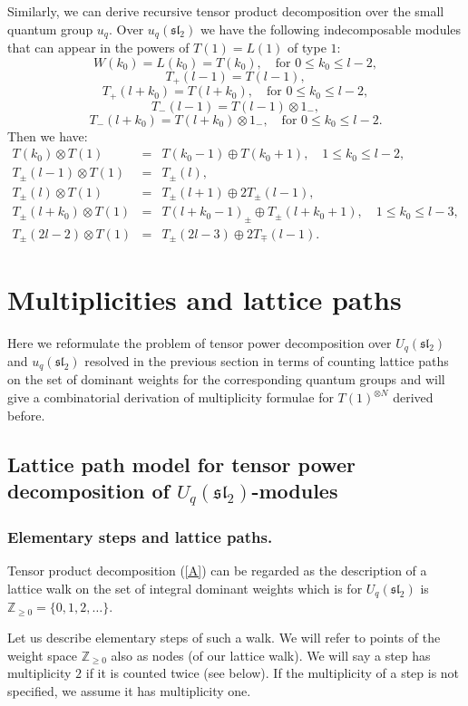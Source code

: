 \documentclass[11pt]{amsart}
\newcommand\lie[1]{\mathfrak{#1}}
\newcommand{\Z}{\mathbb{Z}}
\begin{document}
Similarly, we can derive recursive tensor product decomposition over the small quantum group $u_q$. 
Over $u_q(\lie{sl}_2)$ we have the following indecomposable modules that can appear in the powers of $T(1)=L(1)$ of type $1$:
$$
W(k_0)=L(k_0)=T(k_0),\quad\text{for $0 \leq k_0 \leq l-2$}, 
$$
$$
T_+ (l-1)=T(l-1),
$$
$$
T_+(l+ k_0)=T(l+k_0),\quad\text{for $0 \leq k_0 \leq l-2$},
$$
$$
T_-(l-1)=T(l-1)\otimes 1_-,
$$
$$
T_-(l+k_0)=T(l+k_0) \otimes 1_-,\quad\text{for $0 \leq k_0 \leq l-2$}. 
$$
Then we have:
\begin{eqnarray}\label{B}
T(k_0) \otimes T(1)  &=& T(k_0-1) \oplus T(k_0 +1) , \quad  1 \leq k_0 \leq l-2,  \\ 
T_{\pm}(l-1) \otimes T(1)  &=& T_{\pm}(l),\nonumber \\ 
T_{\pm}(l) \otimes T(1)  &=& T_{\pm}(l+1) \oplus 2 T_{\pm}(l-1),\nonumber \\ 
T_{\pm}(l+ k_0) \otimes T(1) &=& T(l +k_0 -1)_{\pm} \oplus  T_{\pm}(l+k_0 +1) ,\quad 1 \leq k_0 \leq l-3,\nonumber \\ 
T_{\pm}(2l-2) \otimes T(1) &=& T_{\pm}(2l-3) \oplus 2 T_{\mp} (l-1).\nonumber
\end{eqnarray}



\section{Multiplicities and lattice paths}\label{rec-mult}
Here we reformulate the problem of tensor power decomposition over $U_q(\mathfrak{sl}_2)$ and $u_q(\mathfrak{sl}_2)$ resolved in the previous section in terms of counting lattice paths on the set of dominant weights for the corresponding quantum groups and will give a combinatorial derivation of multiplicity formulae for $T(1)^{\otimes N}$ derived before.
\subsection{Lattice path model for tensor power decomposition of $U_q(\lie{sl}_2)$-modules}\label{lpm}
\subsubsection{Elementary steps and lattice paths.} Tensor product decomposition (\ref{A}) can be regarded as the description of a lattice walk on the set of integral dominant weights which is for $U_q(\lie{sl}_2)$ is $\Z_{\geq 0}=\{0,1,2,\dots\}$.

Let us describe elementary steps of such a walk. We will refer to points of the weight space $\Z_{\geq 0}$ also as nodes (of our lattice walk). We will say a step has multiplicity $2$ if it is counted twice (see below). If the multiplicity of a step is not specified, we assume it has multiplicity one.
\end{document}
